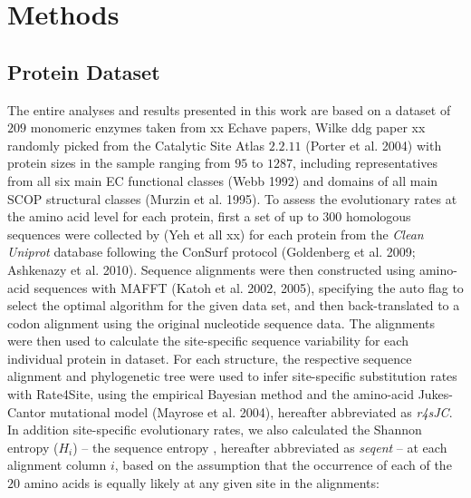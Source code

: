 \documentclass[11pt]{article}
\begin{document}

\section{Methods}
\label{sec:methods}

    \subsection*{Protein Dataset}

        The entire analyses and results presented in this work are based on a dataset of $209$ monomeric enzymes taken from xx Echave papers, Wilke ddg paper xx randomly picked from the Catalytic Site Atlas $2.2.11$ (Porter et al. 2004) with protein sizes in the sample ranging from $95$ to $1287$, including representatives from all six main EC functional classes (Webb 1992) and domains of all main SCOP structural classes (Murzin et al. 1995). To assess the evolutionary rates at the amino acid level for each protein, first a set of up to $300$ homologous sequences were collected by (Yeh et all xx) for each protein from the {\it Clean Uniprot} database following the ConSurf protocol (Goldenberg et al. 2009; Ashkenazy et al. 2010). Sequence alignments were then constructed using amino-acid sequences with MAFFT (Katoh et al. 2002, 2005), specifying the auto flag to select the optimal algorithm for the given data set, and then back-translated to a codon alignment using the original nucleotide sequence data. The alignments were then used to calculate the site-specific sequence variability for each individual protein in dataset. For each structure, the respective sequence alignment and phylogenetic tree were used to infer site-specific substitution rates with Rate4Site, using the empirical Bayesian method and the amino-acid Jukes-Cantor mutational model (Mayrose et al. 2004), hereafter abbreviated as {\it r4sJC}.
        In addition site-specific evolutionary rates, we also calculated the Shannon entropy ($H_i$) -- the sequence entropy \citep[][]{Shenkin1991}, hereafter abbreviated as {\it seqent} -- at each alignment column $i$, based on the assumption that the occurrence of each of the $20$ amino acids is equally likely at any given site in the alignments:
\end{document}
